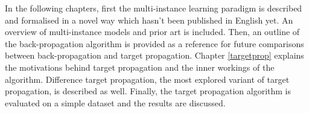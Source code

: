 In the following chapters, first the multi-instance learning paradigm is described and formalised in a novel way which hasn't been published in English yet. An overview of multi-instance models and prior art is included. Then, an outline of the back-propagation algorithm is provided as a reference for future comparisons between back-propagation and target propagation. Chapter \ref{targetprop} explains the motivations behind target propagation and the inner workings of the algorithm. Difference target propagation, the most explored variant of target propagation, is described as well. Finally, the target propagation algorithm is evaluated on a simple dataset and the results are discussed.
